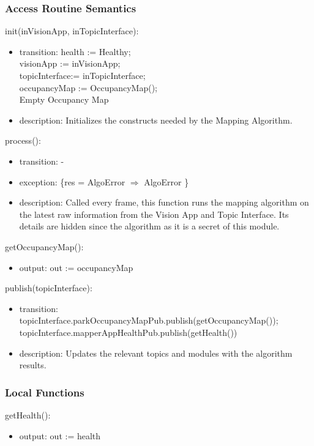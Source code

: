 \documentclass[12pt, titlepage]{article}
\begin{document}
\subsubsection{Access Routine Semantics}
\noindent init(inVisionApp, inTopicInterface):
\begin{itemize}
\item transition: health := Healthy; \\ visionApp := inVisionApp; \\ topicInterface:= inTopicInterface; \\occupancyMap := OccupancyMap(); \\Empty Occupancy Map \\
\item description: Initializes the constructs needed by the Mapping Algorithm.
\end{itemize}
\noindent process():
\begin{itemize}
\item transition: -
\item exception: \{res = AlgoError $\Rightarrow$ AlgoError \}
\item description: Called every frame, this function runs the mapping algorithm on the latest raw information from the Vision App and Topic Interface. Its details are hidden since the algorithm as it is a secret of this module. 
\end{itemize}
\noindent getOccupancyMap():
\begin{itemize}
\item output: out := occupancyMap
\end{itemize}
\noindent publish(topicInterface):
\begin{itemize}
\item transition: topicInterface.parkOccupancyMapPub.publish(getOccupancyMap()); \\ topicInterface.mapperAppHealthPub.publish(getHealth())
\item description: Updates the relevant topics and modules with the algorithm results.
\end{itemize}
\subsubsection{Local Functions}
\noindent getHealth():
\begin{itemize}
\item output: out := health 
\end{itemize}
\newpage
\end{document}
